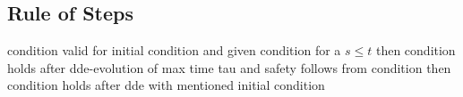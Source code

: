 \documentclass[10pt]{report}
\begin{document}
\begin{calculus}
{            }{}
        \end{calculus}

        \subsection{Rule of Steps}
            \label{sec:rule-of-steps}

            condition valid for initial condition and given condition for a $s\leq t$ then condition holds after dde-evolution of max time tau and safety follows from condition then condition holds after dde with mentioned initial condition

            \begin{calculus}
            \end{calculus}
\end{document}
